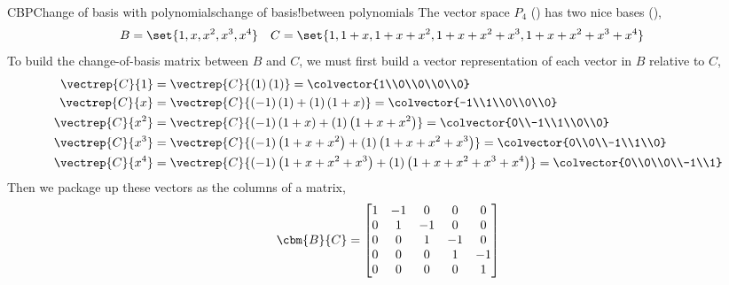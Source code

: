 \begin{example}{CBP}{Change of basis with polynomials}{change of basis!between polynomials}
The vector space $P_4$ () has two nice bases (),
%
\begin{align*}
B&=\set{1,x,x^2,x^3,x^4}
&
C&=\set{1,1+x,1+x+x^2,1+x+x^2+x^3,1+x+x^2+x^3+x^4}
\end{align*}
%
To build the change-of-basis matrix between $B$ and $C$, we must first build a vector representation of each vector in $B$ relative to $C$,
%
\begin{align*}
\vectrep{C}{1}
&=\vectrep{C}{(1)\left(1\right)}
=\colvector{1\\0\\0\\0\\0}\\
%
\vectrep{C}{x}
&=\vectrep{C}{(-1)\left(1\right)+(1)\left(1+x\right)}
=\colvector{-1\\1\\0\\0\\0}\\
%
\vectrep{C}{x^2}
&=\vectrep{C}{(-1)\left(1+x\right)+(1)\left(1+x+x^2\right)}
=\colvector{0\\-1\\1\\0\\0}\\
%
\vectrep{C}{x^3}
&=\vectrep{C}{(-1)\left(1+x+x^2\right)+(1)\left(1+x+x^2+x^3\right)}
=\colvector{0\\0\\-1\\1\\0}\\
%
\vectrep{C}{x^4}
&=\vectrep{C}{(-1)\left(1+x+x^2+x^3\right)+(1)\left(1+x+x^2+x^3+x^4\right)}
=\colvector{0\\0\\0\\-1\\1}
%
\end{align*}
%
Then we package up these vectors as the columns of a matrix,
%
\begin{equation*}
\cbm{B}{C}=
\begin{bmatrix}
1 &-1 & 0 & 0 & 0\\
0 & 1 &-1 & 0 & 0\\
0 & 0 & 1 &-1 & 0\\
0 & 0 & 0 & 1 &-1\\
0 & 0 & 0 & 0 & 1\\

\end{bmatrix}
\end{equation*}
\end{example}
